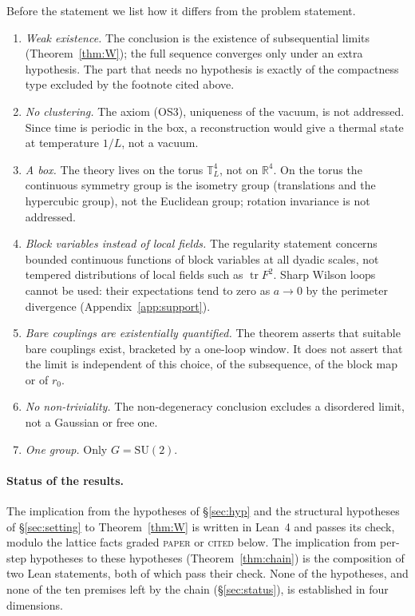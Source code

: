 \documentclass[11pt,a4paper]{article}
\theoremstyle{definition}
\theoremstyle{remark}
\newcommand{\T}{\mathbb{T}}
\newcommand{\tagP}{\textsc{paper}}
\newcommand{\tagK}{\textsc{cited}}
\begin{document}
Before the statement we list how it differs from the problem statement.
\begin{enumerate}[label=(\alph*),leftmargin=2em]
\item \emph{Weak existence.} The conclusion is the existence of subsequential limits (Theorem~\ref{thm:W}); the full sequence converges only under an extra hypothesis. The part that needs no hypothesis is exactly of the compactness type excluded by the footnote cited above.
\item \emph{No clustering.} The axiom (OS3), uniqueness of the vacuum, is not addressed. Since time is periodic in the box, a reconstruction would give a thermal state at temperature $1/L$, not a vacuum.
\item \emph{A box.} The theory lives on the torus $\T^4_L$, not on $\mathbb R^4$. On the torus the continuous symmetry group is the isometry group (translations and the hypercubic group), not the Euclidean group; rotation invariance is not addressed.
\item \emph{Block variables instead of local fields.} The regularity statement concerns bounded continuous functions of block variables at all dyadic scales, not tempered distributions of local fields such as $\operatorname{tr}F^2$. Sharp Wilson loops cannot be used: their expectations tend to zero as $a\to0$ by the perimeter divergence (Appendix~\ref{app:support}).
\item \emph{Bare couplings are existentially quantified.} The theorem asserts that suitable bare couplings exist, bracketed by a one-loop window. It does not assert that the limit is independent of this choice, of the subsequence, of the block map or of $r_0$.
\item \emph{No non-triviality.} The non-degeneracy conclusion excludes a disordered limit, not a Gaussian or free one.
\item \emph{One group.} Only $G=\mathrm{SU}(2)$.
\end{enumerate}

\paragraph{Status of the results.} The implication from the hypotheses of \S\ref{sec:hyp} and the structural hypotheses of \S\ref{sec:setting} to Theorem~\ref{thm:W} is written in Lean~4 and passes its check, modulo the lattice facts graded \tagP{} or \tagK{} below. The implication from per-step hypotheses to these hypotheses (Theorem~\ref{thm:chain}) is the composition of two Lean statements, both of which pass their check. None of the hypotheses, and none of the ten premises left by the chain (\S\ref{sec:status}), is established in four dimensions.
\end{document}
